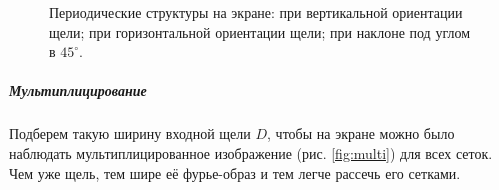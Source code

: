\documentclass[12pt]{article}
\begin{document}
	\begin{figure}  
		\vspace{-4ex} \centering {}  
		\hspace{4ex}
		\hspace{4ex}
		\caption{Периодические структуры на экране:  при вертикальной ориентации щели;  при горизонтальной ориентации щели;  при наклоне под углом в $45^{\circ}$.} \label{fig:filter}
	\end{figure}

	\subparagraph{Мультиплицирование}
	Подберем такую ширину входной щели $D$, чтобы на экране можно было наблюдать мультиплицированное изображение (рис. \ref{fig:multi}) для всех сеток.	Чем уже щель, тем шире её фурье-образ и тем легче рассечь его
	сетками.
	
\end{document}
